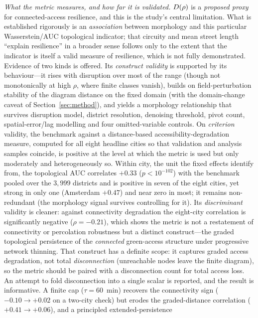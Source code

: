 \emph{What the metric measures, and how far it is validated.} $D(\rho)$ is a
\emph{proposed proxy} for connected-access resilience, and this is the study's central
limitation. What is established rigorously is an \emph{association} between morphology
and this particular Wasserstein/AUC topological indicator; that circuity and mean
street length ``explain resilience'' in a broader sense follows only to the extent
that the indicator is itself a valid measure of resilience, which is not fully
demonstrated. Evidence of two kinds is offered. Its
\emph{construct validity} is supported by its behaviour---it rises with disruption
over most of the range (though not monotonically at high $\rho$, where finite classes
vanish), builds on field-perturbation stability of the diagram distance on the fixed
domain \citep{cohensteiner2007stability} (with the domain-change caveat of
Section~\ref{sec:method}), and yields a morphology relationship that survives
disruption model, district resolution, denoising threshold, pivot count,
spatial-error/lag modelling and four omitted-variable controls. On \emph{criterion} validity, the benchmark against a
distance-based accessibility-degradation measure, computed for all eight headline
cities so that validation and analysis samples coincide, is positive at the level at
which the metric is used but only moderately and heterogeneously so. Within city, the
unit the fixed effects identify from, the topological AUC correlates $+0.33$
($p<10^{-102}$) with the benchmark pooled over the $3{,}999$ districts and is positive
in seven of the eight cities, yet strong in only one (Amsterdam $+0.47$) and near zero
in most; it remains non-redundant (the morphology signal survives controlling for it).
Its \emph{discriminant} validity is cleaner: against connectivity degradation the
eight-city correlation is significantly negative ($\rho=-0.21$), which shows the
metric is not a restatement of connectivity or percolation robustness but a distinct
construct---the graded topological persistence of the \emph{connected} green-access
structure under progressive network thinning. That construct has a definite scope: it
captures graded access degradation, not total \emph{disconnection} (unreachable nodes
leave the finite diagram), so the metric should be paired with a disconnection count
for total access loss. An attempt to fold disconnection into a
single scalar is reported, and the result is informative. A finite cap ($\tau=60$~min) recovers the
connectivity sign ($-0.10\to+0.02$ on a two-city check) but erodes the
graded-distance correlation ($+0.41\to+0.06$), and a principled extended-persistence

